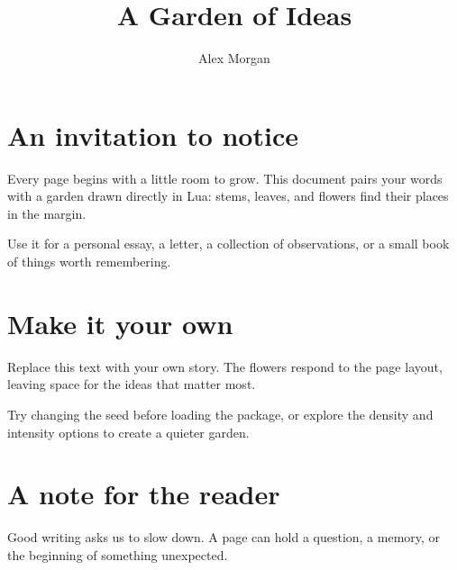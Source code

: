 \documentclass[11pt,a4paper]{article}
\title{A Garden of Ideas}\author{Alex Morgan}\date{}
\begin{document}
\maketitle
\section{An invitation to notice}
Every page begins with a little room to grow. This document pairs your words with a garden drawn directly in Lua: stems, leaves, and flowers find their places in the margin.

Use it for a personal essay, a letter, a collection of observations, or a small book of things worth remembering.
\section{Make it your own}
Replace this text with your own story. The flowers respond to the page layout, leaving space for the ideas that matter most.

Try changing the seed before loading the package, or explore the density and intensity options to create a quieter garden.
\section{A note for the reader}
Good writing asks us to slow down. A page can hold a question, a memory, or the beginning of something unexpected.
\florilegiumtextend
\end{document}
